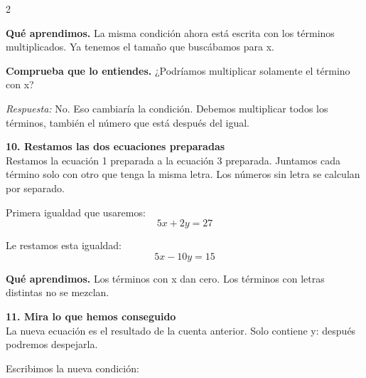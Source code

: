 \documentclass[11pt,a4paper,landscape]{article}
\begin{document}
\begin{multicols*}{2}
\begin{minipage}{\linewidth}
\par\smallskip\textbf{Qué aprendimos.} La misma condición ahora está escrita con los términos multiplicados. Ya tenemos el tamaño que buscábamos para x.
\par\smallskip\textbf{Comprueba que lo entiendes.} ¿Podríamos multiplicar solamente el término con x?\par\textit{Respuesta:} No. Eso cambiaría la condición. Debemos multiplicar todos los términos, también el número que está después del igual.
\end{minipage}\par\medskip
\noindent\begin{minipage}{\linewidth}\textbf{10. Restamos las dos ecuaciones preparadas}\\[2pt]Restamos la ecuación 1 preparada a la ecuación 3 preparada. Juntamos cada término solo con otro que tenga la misma letra. Los números sin letra se calculan por separado.
\par{}\par\smallskip
\par\smallskip Primera igualdad que usaremos:
\[5x + 2y = 27\]
\par\smallskip Le restamos esta igualdad:
\[5x - 10y = 15\]
\par\smallskip\textbf{Qué aprendimos.} Los términos con x dan cero. Los términos con letras distintas no se mezclan.
\end{minipage}\par\medskip
\noindent\begin{minipage}{\linewidth}\textbf{11. Mira lo que hemos conseguido}\\[2pt]La nueva ecuación es el resultado de la cuenta anterior. Solo contiene y: después podremos despejarla.
\par\smallskip Escribimos la nueva condición:

\end{minipage}
\end{multicols*}
\end{document}
